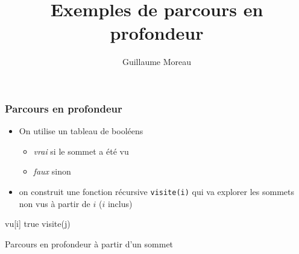 \documentclass[xcolor=dvipsnames]{beamer}
\title{Exemples de parcours en profondeur}
\author{Guillaume Moreau}
\begin{document}
    \maketitle

    \begin{frame}[fragile]
        \frametitle{Parcours en profondeur}
            \begin{itemize}
                \item On utilise un tableau de booléens 
                \begin{itemize}
                    \item \emph{vrai} si le sommet a été vu 
                    \item \emph{faux} sinon 
                \end{itemize}
                \item on construit une fonction récursive \texttt{visite(i)} qui va explorer les sommets non vus à partir de $i$ ($i$ inclus)
            \end{itemize}
            
            \begin{algorithm}[H]
                \begin{algorithmic}[1]
                    \State vu[i] \gets true
                            \State visite(j)
                        \EndIf
                    \EndFor
                    \EndFunction
                 \end{algorithmic}
                \caption{Parcours en profondeur à partir d'un sommet}
                \label{alg:prof:visite}
                \end{algorithm}
        \end{frame}
        
        
        
        
\end{document}
